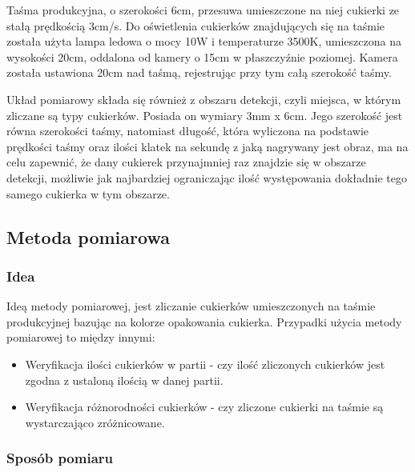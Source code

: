 \documentclass{article}
\begin{document}
Taśma produkcyjna, o szerokości 6cm, przesuwa umieszczone na niej cukierki ze stałą prędkością 3cm/s. Do oświetlenia cukierków znajdujących się na taśmie została użyta lampa ledowa o mocy 10W i temperaturze 3500K, umieszczona na wysokości 20cm, oddalona od kamery o 15cm w płaszczyźnie poziomej. Kamera została ustawiona 20cm nad taśmą, rejestrując przy tym całą szerokość taśmy.

Układ pomiarowy składa się również z obszaru detekcji, czyli miejsca, w którym zliczane są typy cukierków. Posiada on wymiary 3mm x 6cm. Jego szerokość jest równa szerokości taśmy, natomiast długość, która wyliczona na podstawie prędkości taśmy oraz ilości klatek na sekundę z jaką nagrywany jest obraz, ma na celu zapewnić, że dany cukierek przynajmniej raz znajdzie się w obszarze detekcji, możliwie jak najbardziej ograniczając ilość występowania dokładnie tego samego cukierka w tym obszarze.

\subsection{Metoda pomiarowa}
\label{Metoda pomiarowa}
\subsubsection{Idea}
\label{Idea}

Ideą metody pomiarowej, jest zliczanie cukierków umieszczonych na taśmie produkcyjnej bazując na kolorze opakowania cukierka. Przypadki użycia metody pomiarowej to między innymi:

\begin{itemize}
    \item Weryfikacja ilości cukierków w partii - czy ilość zliczonych cukierków jest zgodna z ustaloną ilością w danej partii.
    \item Weryfikacja różnorodności cukierków - czy zliczone cukierki na taśmie są wystarczająco zróżnicowane.
\end{itemize}

\subsubsection{Sposób pomiaru}
\label{Sposób pomiaru}
\end{document}
